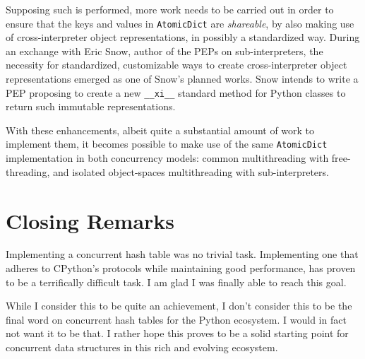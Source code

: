 Supposing such is performed, more work needs to be carried out in order to ensure that the keys and values in \texttt{AtomicDict} are \emph{shareable}, by also making use of cross-interpreter object representations, in possibly a standardized way.
During an exchange with Eric Snow, author of the PEPs on sub-interpreters, the necessity for standardized, customizable ways to create cross-interpreter object representations emerged as one of Snow's planned works.
Snow intends to write a PEP proposing to create a new \texttt{\_\_xi\_\_} standard method for Python classes to return such immutable representations.

With these enhancements, albeit quite a substantial amount of work to implement them, it becomes possible to make use of the same \texttt{AtomicDict} implementation in both concurrency models: common multithreading with free-threading, and isolated object-spaces multithreading with sub-interpreters.


\section{Closing Remarks}\label{sec:closing-remarks}

Implementing a concurrent hash table was no trivial task.
Implementing one that adheres to CPython's protocols while maintaining good performance, has proven to be a terrifically difficult task.
I am glad I was finally able to reach this goal.

While I consider this to be quite an achievement, I don't consider this to be the final word on concurrent hash tables for the Python ecosystem.
I would in fact not want it to be that.
I rather hope this proves to be a solid starting point for concurrent data structures in this rich and evolving ecosystem.

